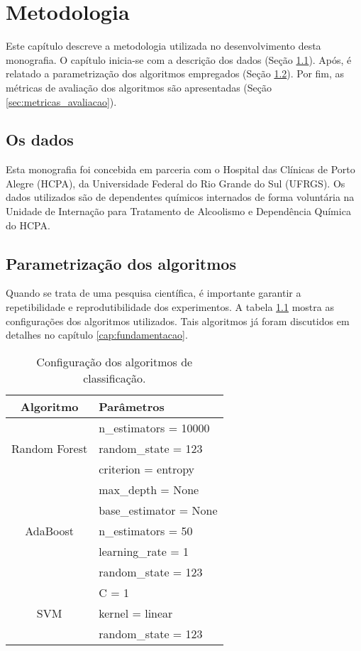 \chapter{Metodologia}

Este capítulo descreve a metodologia utilizada no desenvolvimento desta monografia. O capítulo inicia-se com a descrição dos dados (Seção \ref{sec:dados}). Após, é relatado a parametrização dos algoritmos empregados (Seção \ref{sec:parametrizacao}). Por fim, as métricas de avaliação dos algoritmos são apresentadas (Seção \ref{sec:metricas_avaliacao}).

\section{Os dados}
\label{sec:dados}
Esta monografia foi concebida em parceria com o Hospital das Clínicas de Porto Alegre (HCPA), da Universidade Federal do Rio Grande do Sul (UFRGS). Os dados utilizados são de dependentes químicos internados de forma voluntária na Unidade de Internação para Tratamento de Alcoolismo e Dependência Química do HCPA. 

\section{Parametrização dos algoritmos}
\label{sec:parametrizacao}
Quando se trata de uma pesquisa científica, é importante garantir a repetibilidade e reprodutibilidade dos experimentos. A tabela \ref{tab:parametros-algoritmos} mostra as configurações dos algoritmos utilizados. Tais algoritmos já foram discutidos em detalhes no capítulo \ref{cap:fundamentacao}.

\begin{table}[h!]
\centering
\begin{tabular}{ c l } 
\hline
\textbf{Algoritmo} & \textbf{Parâmetros} \\
\hline

\multirow{3}{8em}{Random Forest} & n\_estimators = 10000 \\  & random\_state = 123 \\ & criterion = entropy \\ & max\_depth = None \\
\hline

\multirow{3}{8em}{AdaBoost} & base\_estimator = None \\  & n\_estimators = 50 \\ & learning\_rate = 1 \\ & random\_state = 123 \\
\hline

\multirow{3}{8em}{SVM} & C = 1 \\  & kernel = linear \\ & random\_state = 123 \\
\hline

\end{tabular}
\caption{Configuração dos algoritmos de classificação.}
\label{tab:parametros-algoritmos}
\end{table}


